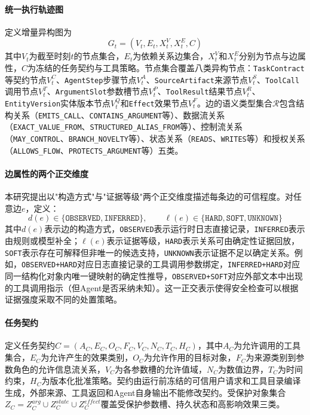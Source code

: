 \paragraph{统一执行轨迹图}
定义增量异构图为
\begin{equation}
  G_t = (V_t, E_t, X_t^V, X_t^E, C)
  \label{eq:unified_graph}
\end{equation}
其中$V_t$为截至时刻$t$的节点集合，$E_t$为依赖关系边集合，$X_t^V$和$X_t^E$分别为节点与边属性，$C$为冻结的任务契约与工具策略。节点集合覆盖八类异构节点：\texttt{TaskContract}等契约节点$V_t^C$、\texttt{AgentStep}步骤节点$V_t^A$、\texttt{SourceArtifact}来源节点$V_t^S$、\texttt{ToolCall}调用节点$V_t^T$、\texttt{ArgumentSlot}参数槽节点$V_t^P$、\texttt{ToolResult}结果节点$V_t^R$、\texttt{EntityVersion}实体版本节点$V_t^Q$和\texttt{Effect}效果节点$V_t^F$。边的语义类型集合$\mathcal{R}$包含结构关系（\texttt{EMITS\_CALL}、\texttt{CONTAINS\_ARGUMENT}等）、数据流关系（\texttt{EXACT\_VALUE\_FROM}、\texttt{STRUCTURED\_ALIAS\_FROM}等）、控制流关系（\texttt{MAY\_CONTROL}、\texttt{BRANCH\_NOVELTY}等）、状态关系（\texttt{READS}、\texttt{WRITES}等）和授权关系（\texttt{ALLOWS\_FLOW}、\texttt{PROTECTS\_ARGUMENT}等）五类。

\paragraph{边属性的两个正交维度}
本研究提出以"构造方式"与"证据等级"两个正交维度描述每条边的可信程度。对任意边$e$，定义：
\begin{equation}
  d(e) \in \{\texttt{OBSERVED}, \texttt{INFERRED}\}, \qquad
  \ell(e) \in \{\texttt{HARD}, \texttt{SOFT}, \texttt{UNKNOWN}\}
  \label{eq:edge_attr}
\end{equation}
其中$d(e)$表示边的构造方式，\texttt{OBSERVED}表示运行时日志直接记录，\texttt{INFERRED}表示由规则或模型补全；$\ell(e)$表示证据等级，\texttt{HARD}表示关系可由确定性证据回放，\texttt{SOFT}表示存在可解释但非唯一的候选支持，\texttt{UNKNOWN}表示证据不足以确定关系。例如，\texttt{OBSERVED+HARD}对应日志直接记录的工具调用参数绑定，\texttt{INFERRED+HARD}对应同一结构化对象内唯一键映射的确定性推导，\texttt{OBSERVED+SOFT}对应外部文本中出现的工具调用指示（但Agent是否采纳未知）。这一正交表示使得安全检查可以根据证据强度采取不同的处置策略。

\paragraph{任务契约}
定义任务契约$C = (A_C, E_C, O_C, F_C, V_C, N_C, T_C, H_C)$，其中$A_C$为允许调用的工具集合，$E_C$为允许产生的效果类别，$O_C$为允许作用的目标对象，$F_C$为来源类别到参数角色的允许信息流关系，$V_C$为各参数槽的允许值域，$N_C$为数值边界，$T_C$为时间约束，$H_C$为版本化批准策略。契约由运行前冻结的可信用户请求和工具目录编译生成，外部来源、工具返回和Agent自身输出不能修改契约。受保护对象集合$Z_C = Z_C^{arg} \cup Z_C^{state} \cup Z_C^{effect}$覆盖受保护参数槽、持久状态和高影响效果三类。

